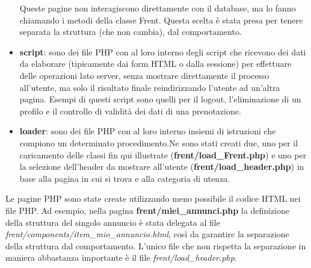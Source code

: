 \documentclass[1_relazione.tex]{subfiles}
\begin{document}
\begin{itemize}
    Queste pagine non interagiscono direttamente con il database, ma lo fanno chiamando i metodi della classe Frent.
    Questa scelta \`{e} stata presa per tenere separata la struttura (che non cambia), dal comportamento.
    \item \textbf{script}: sono dei file PHP con al loro interno degli script che ricevono dei dati da elaborare (tipicamente dai form HTML o dalla sessione) per effettuare delle operazioni lato server, senza mostrare direttamente il processo all'utente, ma solo il risultato finale reindirizzando l'utente ad un'altra pagina.
    Esempi di questi script sono quelli per il logout, l'eliminazione di un profilo e il controllo di validità dei dati di una prenotazione.
    \item \textbf{loader}: sono dei file PHP con al loro interno insiemi di istruzioni che compiono un determinato procedimento.\newline Ne sono stati creati due, uno per il caricamento delle classi fin qui illustrate (\textbf{frent/load\_Frent.php}) e uno per la selezione dell'header da mostrare all'utente (\textbf{frent/load\_header.php}) in base alla pagina in cui si trova e alla categoria di utenza.
\end{itemize}
Le pagine PHP sono state create utilizzando meno possibile il codice HTML nei file PHP.
Ad esempio, nella pagina \textbf{frent/miei\_annunci.php} la definizione della struttura del singolo annuncio \`{e} stata delegata al file \textit{frent/components/item\_mio\_annuncio.html}, così da garantire la separazione della struttura dal comportamento.
L'unico file che non rispetta la separazione in maniera abbastanza importante è il file \textit{frent/load\_header.php}.\\
\end{document}
